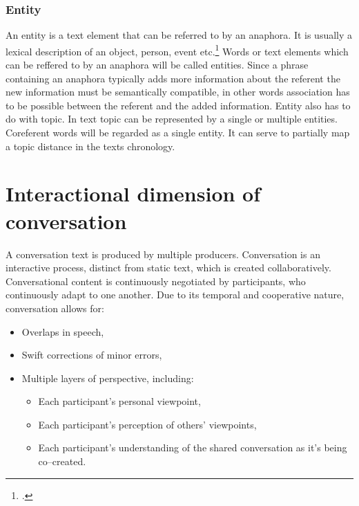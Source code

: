 \documentclass[12pt]{report}
\begin{document}
{\subsubsection{Entity}
\par
    An entity is a text element that can be referred to by an anaphora.
    It is usually a lexical description of an object, person, event etc.\footcite{entities}
    Words or text elements which can be reffered to by an anaphora will be called entities.
    Since a phrase containing an anaphora typically adds more information about the referent
    the new information must be semantically compatible,
    in other words association has to be possible between the referent and the added information.
    Entity also has to do with topic.
    In text topic can be represented by a single or multiple entities.
    Coreferent words will be regarded as a single entity.
    It can serve to partially map a topic distance in the texts chronology.

\section{Interactional dimension of conversation}
\par
A conversation text is produced by multiple producers.
Conversation is an interactive process, distinct from static text, which is created collaboratively.
Conversational content is continuously negotiated by participants, who continuously adapt to one another.
Due to its temporal and cooperative nature, conversation allows for:
\begin{itemize}

    \item
    Overlaps in speech,

    \item
    Swift corrections of minor errors,

    \item
    Multiple layers of perspective, including:
        \begin{itemize}

            \item
            Each participant’s personal viewpoint,

            \item
            Each participant’s perception of others’ viewpoints,

            \item
            Each participant’s understanding of the shared conversation as it’s being co–created.
        \end{itemize}
\end{itemize}

}
\end{document}
